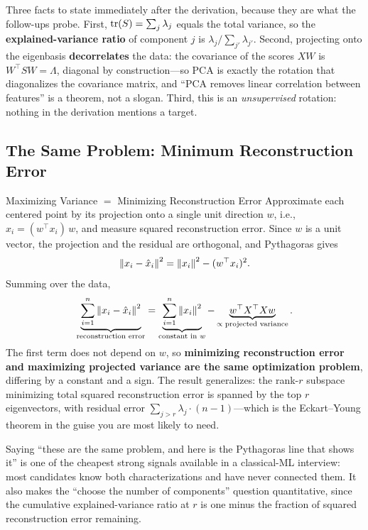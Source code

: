 Three facts to state immediately after the derivation, because they are what the follow-ups probe. First, $\operatorname{tr}(S) = \sum_j \lambda_j$ equals the total variance, so the \textbf{explained-variance ratio} of component $j$ is $\lambda_j / \sum_{j'} \lambda_{j'}$. Second, projecting onto the eigenbasis \textbf{decorrelates} the data: the covariance of the scores $XW$ is $W^\top S W = \Lambda$, diagonal by construction---so PCA is exactly the rotation that diagonalizes the covariance matrix, and ``PCA removes linear correlation between features'' is a theorem, not a slogan. Third, this is an \emph{unsupervised} rotation: nothing in the derivation mentions a target.

\subsection{The Same Problem: Minimum Reconstruction Error}

\begin{mathresult}{Maximizing Variance $=$ Minimizing Reconstruction Error}
Approximate each centered point by its projection onto a single unit direction $w$, i.e., $\hat{x}_i = (w^\top x_i)\, w$, and measure squared reconstruction error. Since $w$ is a unit vector, the projection and the residual are orthogonal, and Pythagoras gives
\begin{equation}
\left\lVert x_i - \hat{x}_i\right\rVert^2 = \left\lVert x_i\right\rVert^2 - (w^\top x_i)^2 .
\end{equation}
Summing over the data,
\begin{equation}
\underbrace{\sum_{i=1}^n \left\lVert x_i - \hat{x}_i\right\rVert^2}_{\text{reconstruction error}} = \underbrace{\sum_{i=1}^n \left\lVert x_i\right\rVert^2}_{\text{constant in } w} - \underbrace{w^\top X^\top X w}_{\propto\;\text{projected variance}} .
\end{equation}
The first term does not depend on $w$, so \textbf{minimizing reconstruction error and maximizing projected variance are the same optimization problem}, differing by a constant and a sign. The result generalizes: the rank-$r$ subspace minimizing total squared reconstruction error is spanned by the top $r$ eigenvectors, with residual error $\sum_{j > r}\lambda_j \cdot (n-1)$---which is the Eckart--Young theorem in the guise you are most likely to need.
\end{mathresult}

Saying ``these are the same problem, and here is the Pythagoras line that shows it'' is one of the cheapest strong signals available in a classical-ML interview: most candidates know both characterizations and have never connected them. It also makes the ``choose the number of components'' question quantitative, since the cumulative explained-variance ratio at $r$ is one minus the fraction of squared reconstruction error remaining.

